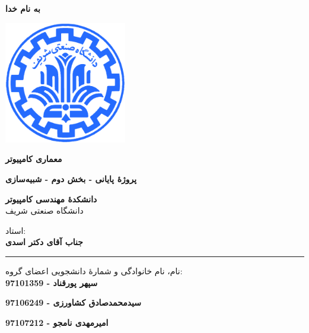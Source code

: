 \documentclass[12pt,titlepage,a4page , tikz , multi,table , svgnames,xcdraw]{article}
\begin{document}
\begin{titlepage}

 \begin{center}
        
       \vspace*{1cm}

 \vspace{1cm}
       \textbf{ \Huge{به نام خدا} }
       \vspace{0.4cm}
       
       \includegraphics[width=0.4\textwidth]{sharif.png}
       
 	\vspace{0.7cm}
       \textbf{ \LARGE{معماری کامپیوتر} }

 
   \vspace{0.7cm}
  \textbf{ \Large{ پروژهٔ پایانی - بخش دوم - شبیه‌سازی } }
   \vspace{0.5cm}
       
 
      \large \textbf{دانشکدهٔ مهندسی کامپیوتر}\\\vspace{0.2cm}
    \large   دانشگاه صنعتی شریف\\\vspace{0.25cm}
      
استاد:\\
    \textbf{{جناب آقای دکتر اسدی}}

    \vspace{0.15cm}
    \noindent\rule[1ex]{\linewidth}{3pt}
    
    \vspace{0.5cm}
نام، نام خانوادگی و شمارهٔ دانشجویی اعضای گروه:\\
    \textbf{{سپهر پورقناد - 97101359}}
        \vspace{0.1cm}
        
     \textbf{{سیدمحمدصادق کشاورزی - 97106249}}
        \vspace{0.1cm}
        
       \textbf{{امیرمهدی نامجو - 97107212}}
        \vspace{0.1cm}


\end{center}
\end{titlepage}
\end{document}

